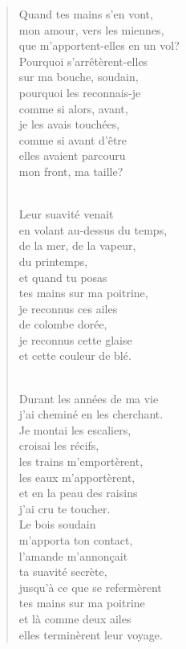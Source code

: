 \documentclass[11pt,a4paper]{book}
\begin{document}
\begin{verse}
Quand tes mains s'en vont, \\
mon amour, vers les miennes, \\
que m'apportent-elles en un vol? \\
Pourquoi s'arrêtèrent-elles \\
sur ma bouche, soudain, \\
pourquoi les reconnais-je \\
comme si alors, avant, \\
je les avais touchées, \\
comme si avant d'être \\
elles avaient parcouru \\
mon front, ma taille? \\ \

Leur suavité venait \\
en volant au-dessus du temps, \\
de la mer, de la vapeur, \\
du printemps, \\
et quand tu posas \\
tes mains sur ma poitrine, \\
je reconnus ces ailes \\
de colombe dorée, \\
je reconnus cette glaise \\
et cette couleur de blé. \\ \

Durant les années de ma vie \\
j'ai cheminé en les cherchant. \\
Je montai les escaliers, \\
croisai les récifs, \\
les trains m'emportèrent, \\
les eaux m'apportèrent, \\
et en la peau des raisins \\
j'ai cru te toucher. \\
Le bois soudain \\
m'apporta ton contact, \\
l'amande m'annon\c{c}ait \\
ta suavité secrète, \\
jusqu'à ce que se refermèrent \\
tes mains sur ma poitrine \\
et là comme deux ailes \\
elles terminèrent leur voyage.
\end{verse}
\end{document}
